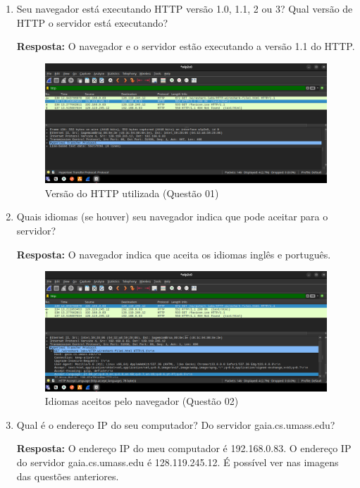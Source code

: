 \documentclass[12pt,a4paper]{report}
\begin{document}
	\begin{enumerate}
		\item Seu navegador está executando HTTP versão 1.0, 1.1, 2 ou 3? Qual versão de HTTP o servidor está executando?
		
		\textbf{Resposta:} O navegador e o servidor estão executando a versão 1.1 do HTTP.

		\begin{figure}[H]
			\centering
			\includegraphics[width=1\textwidth]{q1.png}
			\caption{Versão do HTTP utilizada (Questão 01)}
			\label{fig:versaoHTTP}
		\end{figure}

		\item Quais idiomas (se houver) seu navegador indica que pode aceitar para o servidor?
		
		\textbf{Resposta:} O navegador indica que aceita os idiomas inglês e português.

		\begin{figure}[H]
			\centering
			\includegraphics[width=1\textwidth]{q2.png}
			\caption{Idiomas aceitos pelo navegador (Questão 02)}
			\label{fig:idiomasAceitos}
		\end{figure}

		\item Qual é o endereço IP do seu computador? Do servidor gaia.cs.umass.edu?
		
		\textbf{Resposta:} O endereço IP do meu computador é 192.168.0.83. O endereço IP do servidor gaia.cs.umass.edu é 128.119.245.12. É possível ver nas imagens das questões anteriores.


\end{enumerate}
\end{document}
